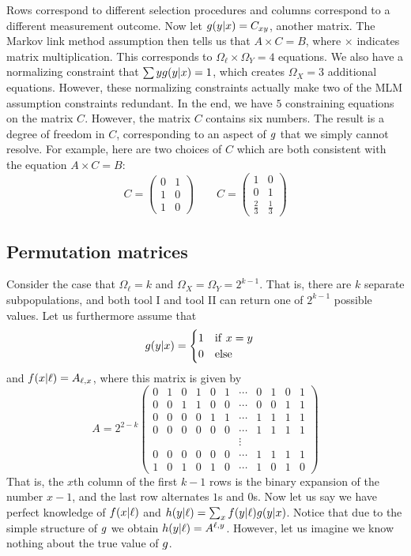 Rows correspond to different selection procedures and columns correspond to a different measurement outcome.  Now let $g(y|x)=C_{x y}$, another matrix.  The Markov link method assumption then tells us that $A\times C=B$, where $\times$ indicates matrix multiplication.  This corresponds to $\Omega_\ell \times \Omega_Y = 4$ equations.  We also have a normalizing constraint that $\sum y g(y|x)=1$, which creates $\Omega_X=3$ additional equations.  However, these normalizing constraints actually make two of the MLM assumption constraints redundant.  In the end, we have $5$ constraining equations on the matrix $C$.  However, the matrix $C$ contains six numbers.  The result is a degree of freedom in $C$, corresponding to an aspect of $g$ that we simply cannot resolve.  For example, here are two choices of $C$ which are both consistent with the equation $A\times C=B$:
\[
C=\left(\begin{array}{cc}
0 & 1\\
1 & 0\\
1 & 0
\end{array}\right)\qquad C=\left(\begin{array}{cc}
1 & 0\\
0 & 1\\
\frac{2}{3} & \frac{1}{3}
\end{array}\right)
\]



\subsection{Permutation matrices}

Consider the case that $\Omega_\ell = k$ and $\Omega_X=\Omega_Y=2^{k-1}$.  That is, there are $k$ separate subpopulations, and both tool I and tool II can return one of $2^{k-1}$ possible values.  Let us furthermore assume that
\[
\pxy(y|x)=\begin{cases}1 \quad \mathrm{if}\ x=y\\0\quad \mathrm{else}\end{cases}
\]
and  $f(x|\ell)=A_{\ell,x}$, where this matrix is given by
\[
A=2^{2-k}\left(\begin{array}{ccccccccccc}
0 & 1 & 0 & 1 & 0 & 1 & \cdots & 0 & 1 & 0 & 1\\
0 & 0 & 1 & 1 & 0 & 0 & \cdots & 0 & 0 & 1 & 1\\
0 & 0 & 0 & 0 & 1 & 1 & \cdots & 1 & 1 & 1 & 1\\
0 & 0 & 0 & 0 & 0 & 0 & \cdots & 1 & 1 & 1 & 1\\
 &  &  &  &  &  & \vdots\\
0 & 0 & 0 & 0 & 0 & 0 & \cdots & 1 & 1 & 1 & 1\\
1 & 0 & 1 & 0 & 1 & 0 & \cdots & 1 & 0 & 1 & 0
\end{array}\right)
\]
That is, the $x$th column of the first $k-1$ rows is the binary expansion of the number $x-1$, and the last row alternates $1$s and $0$s.  Now let us say we have perfect knowledge of $f(x|\ell)$ and $h(y|\ell)=\sum_x f(y|\ell)g(y|x)$.  Notice that due to the simple structure of $g$ we obtain $h(y|\ell)=A^{\ell,y}$.  However, let us imagine we know nothing about the true value of $g$.  

